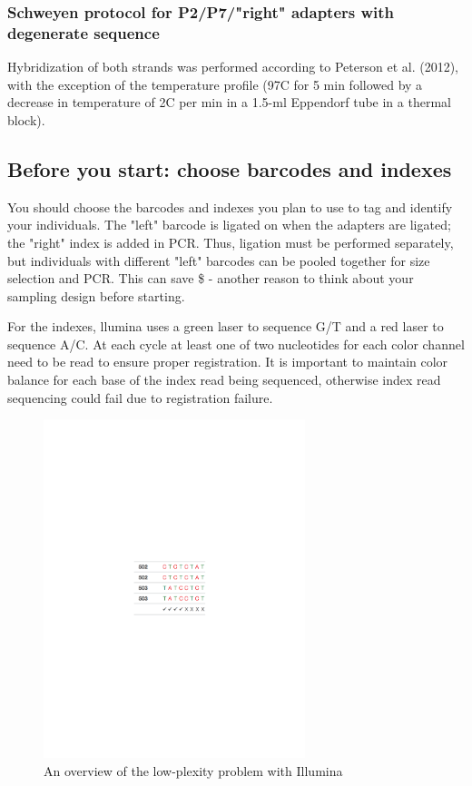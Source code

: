 \documentclass[11pt, oneside]{article}
\begin{document}
	\subsubsection{Schweyen protocol for P2/P7/"right" adapters with degenerate sequence}
		Hybridization of both strands was performed according to Peterson et al. (2012), with the exception of the temperature profile (97C for 5 min followed by a decrease in temperature of 2C per min in a 1.5-ml Eppendorf tube in a thermal block).
			
	\subsection {Before you start: choose barcodes and indexes}
	You should choose the barcodes and indexes you plan to use to tag and identify your individuals.  The "left" barcode is ligated on when the adapters are ligated; the "right" index is added in PCR.  Thus, ligation must be performed separately, but individuals with different "left" barcodes can be pooled together for size selection and PCR.   This can save \$ - another reason to think about your sampling design before starting.  
	
	For the indexes, llumina uses a green laser to sequence G/T and a red laser to sequence A/C. At each cycle at least one of two nucleotides for each color channel need to be read to ensure proper registration. It is important to maintain color balance for each base of the index read being sequenced, otherwise index read sequencing could fail due to registration failure. 
	
		\begin{figure}[h]
			\includegraphics[width=3in]{./images/lowPlexityproblem.pdf}
			\caption{An overview of the low-plexity problem with Illumina}
		\end{figure}
    
\end{document}
